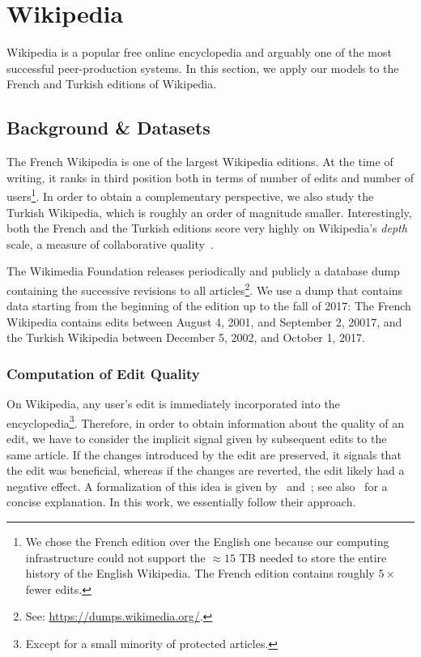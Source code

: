 \section{Wikipedia}
\label{pps:sec:wikipedia}

Wikipedia is a popular free online encyclopedia and arguably one of the most successful peer-production systems.
In this section, we apply our models to the French and Turkish editions of Wikipedia.

\subsection{Background \& Datasets}

The French Wikipedia is one of the largest Wikipedia editions.
At the time of writing, it ranks in third position both in terms of number of edits and number of users\footnote{%
	We chose the French edition over the English one because our computing infrastructure could not support the $\approx15$ TB needed to store the entire history of the English Wikipedia.
	The French edition contains roughly $5\times$ fewer edits.
}.
In order to obtain a complementary perspective, we also study the Turkish Wikipedia, which is roughly an order of magnitude smaller.
Interestingly, both the French and the Turkish editions score very highly on Wikipedia's \emph{depth} scale, a measure of collaborative quality~\citep{wikimedia2017depth}.

The Wikimedia Foundation releases periodically and publicly a database dump containing the successive revisions to all articles\footnote{%
	See: \url{https://dumps.wikimedia.org/}.}.
We use a dump that contains data starting from the beginning of the edition up to the fall of 2017:
The French Wikipedia contains edits between August 4, 2001, and September 2, 20017, and the Turkish Wikipedia between December 5, 2002, and October 1, 2017.

\subsubsection{Computation of Edit Quality}

On Wikipedia, any user's edit is immediately incorporated into the encyclopedia\footnote{Except for a small minority of protected articles.}.
Therefore, in order to obtain information about the quality of an edit, we have to consider the implicit signal given by subsequent edits to the same article.
If the changes introduced by the edit are preserved, it signals that the edit was beneficial, whereas if the changes are reverted, the edit likely had a negative effect.
A formalization of this idea is given by~\citet{adler2007content} and~\citet{druck2008learning};
see also~\citet{dealfaro2013content} for a concise explanation.
In this work, we essentially follow their approach.

